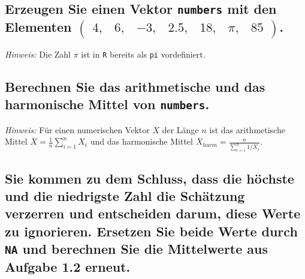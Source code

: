 \documentclass[12pt,a4paper]{article}
\begin{document}
\hypertarget{erzeugen-sie-einen-vektor-mit-den-elementen-beginpmatrix-4-6--3-2.5-18-pi-85-endpmatrix.}{%
\subsection{\texorpdfstring{Erzeugen Sie einen Vektor \texttt{numbers}
mit den Elementen
\(\begin{pmatrix} 4, & 6, & -3, & 2.5, & 18, & \pi, & 85 \end{pmatrix}\).}{Erzeugen Sie einen Vektor  mit den Elementen \textbackslash begin\{pmatrix\} 4, \& 6, \& -3, \& 2.5, \& 18, \& \textbackslash pi, \& 85 \textbackslash end\{pmatrix\}.}}\label{erzeugen-sie-einen-vektor-mit-den-elementen-beginpmatrix-4-6--3-2.5-18-pi-85-endpmatrix.}}

\emph{Hinweis:} Die Zahl \(\pi\) ist in \texttt{R} bereits als
\texttt{pi} vordefiniert.

\hypertarget{berechnen-sie-das-arithmetische-und-das-harmonische-mittel-von-.}{%
\subsection{\texorpdfstring{Berechnen Sie das arithmetische und das
harmonische Mittel von
\texttt{numbers}.}{Berechnen Sie das arithmetische und das harmonische Mittel von .}}\label{berechnen-sie-das-arithmetische-und-das-harmonische-mittel-von-.}}

\emph{Hinweis:} Für einen numerischen Vektor \(X\) der Länge \(n\) ist
das arithmetische Mittel \(\overline{X} = \frac{1}{n} \sum_{i=1}^n X_i\)
und das harmonische Mittel
\(\overline{X}_{harm} = \frac{n}{\sum_{i=1}^n 1/X_i}\).

\hypertarget{sie-kommen-zu-dem-schluss-dass-die-huxf6chste-und-die-niedrigste-zahl-die-schuxe4tzung-verzerren-und-entscheiden-darum-diese-werte-zu-ignorieren.-ersetzen-sie-beide-werte-durch-und-berechnen-sie-die-mittelwerte-aus-aufgabe-1.2-erneut.}{%
\subsection{\texorpdfstring{Sie kommen zu dem Schluss, dass die höchste
und die niedrigste Zahl die Schätzung verzerren und entscheiden darum,
diese Werte zu ignorieren. Ersetzen Sie beide Werte durch \texttt{NA}
und berechnen Sie die Mittelwerte aus Aufgabe 1.2
erneut.}{Sie kommen zu dem Schluss, dass die höchste und die niedrigste Zahl die Schätzung verzerren und entscheiden darum, diese Werte zu ignorieren. Ersetzen Sie beide Werte durch  und berechnen Sie die Mittelwerte aus Aufgabe 1.2 erneut.}}\label{sie-kommen-zu-dem-schluss-dass-die-huxf6chste-und-die-niedrigste-zahl-die-schuxe4tzung-verzerren-und-entscheiden-darum-diese-werte-zu-ignorieren.-ersetzen-sie-beide-werte-durch-und-berechnen-sie-die-mittelwerte-aus-aufgabe-1.2-erneut.}}
\end{document}
